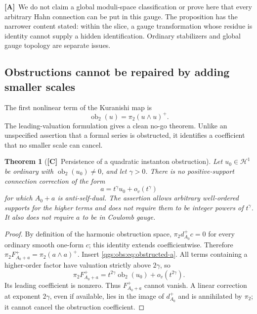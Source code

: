 \documentclass[11pt,oneside]{article}
\numberwithin{equation}{section}
\theoremstyle{plain}
\newtheorem{theorem}{Theorem}[section]
\theoremstyle{definition}
\theoremstyle{remark}
\newcommand{\ob}{\operatorname{ob}}
\newcommand{\TC}{\textcolor{TierC}{\textsf{\bfseries[C]}}}
\newcommand{\TA}{\textcolor{TierA}{\textsf{\bfseries[A]}}}
\begin{document}
\TA\ We do not claim a global moduli-space classification or prove here that every arbitrary Hahn connection can be put in this gauge. The proposition has the narrower content stated: within the slice, a gauge transformation whose residue is identity cannot supply a hidden identification. Ordinary stabilizers and global gauge topology are separate issues.

\subsection{Obstructions cannot be repaired by adding smaller scales}
The first nonlinear term of the Kuranishi map is
\begin{equation}\label{qgs:obs:eq:kappa2}
 \ob_2(u)=\pi_2(u\wedge u)^+.
\end{equation}
The leading-valuation formulation gives a clean no-go theorem. Unlike an unspecified assertion that a formal series is obstructed, it identifies a coefficient that no smaller scale can cancel.

\begin{theorem}[\TC\ Persistence of a quadratic instanton obstruction]\label{qgs:obs:thm:obstruction}
Let $u_0\in\mathcal H^1$ be ordinary with $\ob_2(u_0)\ne0$, and let $\gamma>0$. There is no positive-support connection correction of the form
\begin{equation}\label{qgs:obs:eq:obstructed-a}
 a=t^\gamma u_0+o_v(t^\gamma)
\end{equation}
for which $A_0+a$ is anti-self-dual. The assertion allows arbitrary well-ordered supports for the higher terms and does not require them to be integer powers of $t^\gamma$. It also does not require $a$ to be in Coulomb gauge.
\end{theorem}
\begin{proof}
By definition of the harmonic obstruction space, $\pi_2d_{A_0}^+c=0$ for every ordinary smooth one-form $c$; this identity extends coefficientwise. Therefore $\pi_2F_{A_0+a}^+=\pi_2(a\wedge a)^+$. Insert \eqref{qgs:obs:eq:obstructed-a}. All terms containing a higher-order factor have valuation strictly above $2\gamma$, so
\begin{equation}\label{qgs:obs:eq:obstruction-leading}
 \pi_2F_{A_0+a}^+
 =t^{2\gamma}\ob_2(u_0)+o_v(t^{2\gamma}).
\end{equation}
Its leading coefficient is nonzero. Thus $F_{A_0+a}^+$ cannot vanish. A linear correction at exponent $2\gamma$, even if available, lies in the image of $d_{A_0}^+$ and is annihilated by $\pi_2$; it cannot cancel the obstruction coefficient.
\end{proof}
\end{document}
